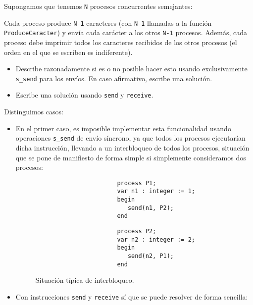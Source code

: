 \begin{ejercicio}\label{ej:rel3_11}
    Supongamos que tenemos \verb|N| procesos concurrentes semejantes:

    Cada proceso produce \verb|N-1| caracteres (con \verb|N-1| llamadas a la función \verb|ProduceCaracter|) y envía cada carácter a los otros \verb|N-1| procesos. Además, cada proceso debe imprimir todos los caracteres recibidos de los otros procesos (el orden en el que se escriben es indiferente).
    \begin{itemize}
        \item Describe razonadamente si es o no posible hacer esto usando exclusivamente \verb|s_send| para los envíos. En caso afirmativo, escribe una solución.
        \item Escribe una solución usando \verb|send| y \verb|receive|.
    \end{itemize}
    Distinguimos casos:
    \begin{itemize}
        \item En el primer caso, es imposible implementar esta funcionalidad usando operaciones \verb|s_send| de envío síncrono, ya que todos los procesos ejecutarían dicha instrucción, llevando a un interbloqueo de todos los procesos, situación que se pone de manifiesto de forma simple si simplemente consideramos dos procesos:
            \begin{figure}[H]
                \setlength{\columnsep}{1cm}
                \begin{multicols}{2}
                    \begin{verbatim}
                       process P1;    
                       var n1 : integer := 1;
                       begin
                          send(n1, P2);
                       end
                    \end{verbatim}
                    \begin{verbatim}
                       process P2;    
                       var n2 : integer := 2;
                       begin
                          send(n2, P1);
                       end
                    \end{verbatim}
                \end{multicols}
                \caption{Situación típica de interbloqueo.}
            \end{figure}
        \item Con instrucciones \verb|send| y \verb|receive| sí que se puede resolver de forma sencilla:
            \begin{verbatim}

\end{verbatim}
\end{itemize}
\end{ejercicio}
